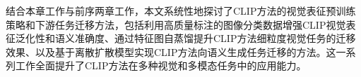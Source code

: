 结合本章工作与前序两章工作，本文系统性地探讨了CLIP方法的视觉表征预训练策略和下游任务迁移方法，包括利用高质量标注的图像分类数据增强CLIP视觉表征泛化性和语义准确度、通过特征图自蒸馏提升CLIP方法细粒度视觉任务的迁移效果、以及基于离散扩散模型实现CLIP方法向语义生成任务迁移的方法。这一系列工作全面提升了CLIP方法在多种视觉和多模态任务中的应用能力。

